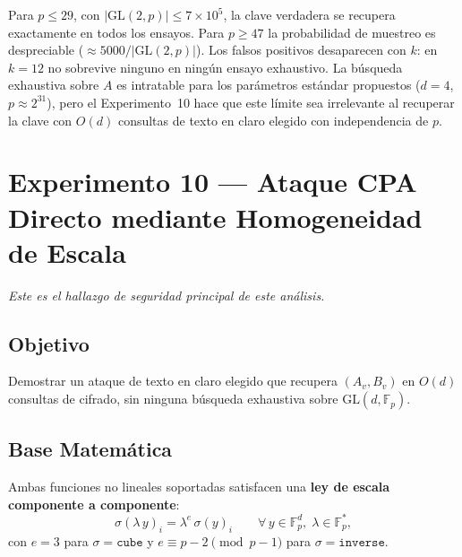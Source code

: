 \documentclass[12pt,a4paper]{article}
\theoremstyle{definition}
\newcommand{\Fp}{\mathbb{F}_p}
\newcommand{\GL}{\mathrm{GL}}
\begin{document}
Para $p \leq 29$, con $|\GL(2, p)| \leq 7\times 10^5$, la clave
verdadera se recupera exactamente en todos los ensayos. Para
$p \geq 47$ la probabilidad de muestreo es despreciable
(${\approx}5000/|\GL(2,p)|$). Los falsos positivos desaparecen con
$k$: en $k = 12$ no sobrevive ninguno en ningún ensayo exhaustivo.
La búsqueda exhaustiva sobre $A$ es intratable para los parámetros
estándar propuestos ($d = 4$, $p \approx 2^{31}$), pero el
Experimento~10 hace que este límite sea irrelevante al recuperar la
clave con $O(d)$ consultas de texto en claro elegido con independencia
de $p$.

\section{Experimento 10 --- Ataque CPA Directo mediante Homogeneidad de Escala}

\textit{Este es el hallazgo de seguridad principal de este análisis.}

\subsection{Objetivo}

Demostrar un ataque de texto en claro elegido que recupera
$(A_v, B_v)$ en $O(d)$ consultas de cifrado, sin ninguna búsqueda
exhaustiva sobre $\GL(d, \Fp)$.

\subsection{Base Matemática}
\label{sub:escala}

Ambas funciones no lineales soportadas satisfacen una
\textbf{ley de escala componente a componente}:
\begin{equation}\label{eq:homogeneidad}
  \sigma(\lambda\, y)_i = \lambda^e\, \sigma(y)_i
  \qquad \forall\, y \in \Fp^d,\; \lambda \in \Fp^*,
\end{equation}
con $e = 3$ para $\sigma = \texttt{cube}$ y
$e \equiv p-2 \pmod{p-1}$ para $\sigma = \texttt{inverse}$.
\end{document}
